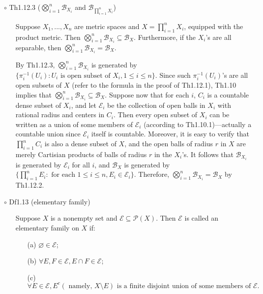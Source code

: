 \documentclass{article}
\begin{document}
{\Large $\circ $ Th1.12.3 ($\bigotimes_{i=1}^n \mathcal{B}_{X_i}$ and $\mathcal{B}_{\prod_{i=1}^n X_i}$)}\par
\begin{itemize}
    \item[]
    {\large Suppose $X_1,...,X_n$ are metric spaces and $X=\prod_{i=1}^n X_i$, equipped with the product metric.
    Then $\bigotimes_{i=1}^n \mathcal{B}_{X_i} \subseteq \mathcal{B}_X$. Furthermore, if the $X_i$'s are all 
    separable, then $\bigotimes_{i=1}^n \mathcal{B}_{X_i} = \mathcal{B}_X$.}\par
    {\textcolor{pf}{By Th1.12.3, $\bigotimes_{i=1}^n \mathcal{B}_{X_i}$ is generated by 
    $\{\pi_i^{-1}(U_i):U_i \text{ is open subset of } X_i, 1\leqslant i\leqslant n\}$. 
    Since such $\pi_i^{-1}(U_i)$'s are all open subsets of $X$ (refer to the formula in the proof of Th1.12.1),
    Th1.10 implies that $\bigotimes_{i=1}^n \mathcal{B}_{X_i} \subseteq \mathcal{B}_X$. Suppose now that for
    each $i$, $C_i$ is a countable dense subset of $X_i$, and let $\mathcal{E}_i$ be the collection of open balls
    in $X_i$ with rational radius and centers in $C_i$. Then every open subset of $X_i$ can be written as a union
    of some members of $\mathcal{E}_i$ (according to Th1.10.1)---actually a countable union since $\mathcal{E}_i$
    itself is countable. Moreover, it is easy to verify that $\prod_{i=1}^n C_i$ is also a dense subset of $X$, 
    and the open balls of radius $r$ in $X$ are merely Cartisian products of balls of radius $r$ in the $X_i$'s.
    It follows that $\mathcal{B}_{X_i}$ is generated by $\mathcal{E}_i$ for all $i$, and $\mathcal{B}_X$ is 
    generated by $\{\prod_{i=1}^n E_i: \text{ for each } 1\leqslant i\leqslant n, E_i \in\mathcal{E}_i\}$.
    Therefore, $\bigotimes_{i=1}^n \mathcal{B}_{X_i} = \mathcal{B}_X$ by Th1.12.2.}}
\end{itemize}\par
\quad

{\Large $\circ $ Df1.13 (elementary family)}\par
\begin{itemize}
    \item[]
    {\large Suppose $X$ is a nonempty set and $\mathcal{E}\subseteq \mathcal{P}(X)$. Then $\mathcal{E}$ is called
    an elementary family on $X$ if:
    \begin{enumerate}
        \item[(a)] $\varnothing\in \mathcal{E}$;
        \item[(b)] $\forall E,F\in \mathcal{E}, E\cap F\in\mathcal{E}$;
        \item[(c)] $\forall E\in \mathcal{E}, E^c (\text{ namely, }X\setminus E) 
                    \text{ is a finite disjoint union of some members of }\mathcal{E}.$ 
    \end{enumerate}}
\end{itemize}\par
\quad
\end{document}
